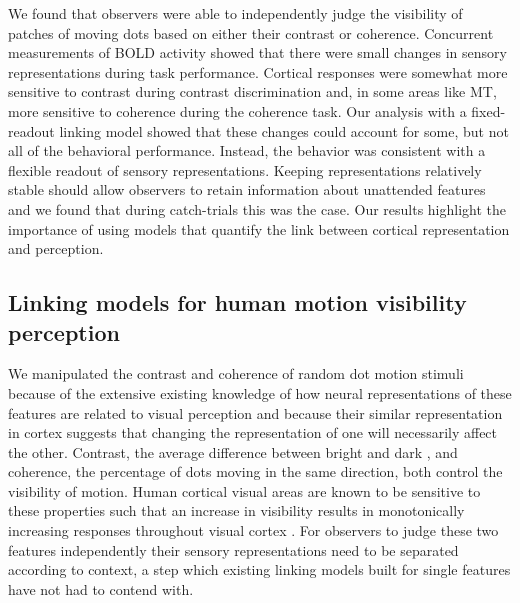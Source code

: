 We found that observers were able to independently judge the visibility of patches of moving dots based on either their contrast or coherence. Concurrent measurements of BOLD activity showed that there were small changes in sensory representations during task performance. Cortical responses were somewhat more sensitive to contrast during contrast discrimination and, in some areas like MT, more sensitive to coherence during the coherence task. Our analysis with a fixed-readout linking model showed that these changes could account for some, but not all of the behavioral performance. Instead, the behavior was consistent with a flexible readout of sensory representations. Keeping representations relatively stable should allow observers to retain information about unattended features and we found that during catch-trials this was the case. Our results highlight the importance of using models that quantify the link between cortical representation and perception.

\subsection{Linking models for human motion visibility perception}

We manipulated the contrast and coherence of random dot motion stimuli because of the extensive existing knowledge of how neural representations of these features are related to  visual perception \citep{Gold2007-ys} and because their similar representation in cortex suggests that changing the representation of one will necessarily affect the other. Contrast, the average difference between bright and dark \citep{Bex2002-it}, and coherence, the percentage of dots moving in the same direction, both control the visibility of motion. Human cortical visual areas are known to be sensitive to these properties such that an increase in visibility results in monotonically increasing responses throughout visual cortex \citep{Avidan2002-jg,Birman2018-sp,Britten1993-oh,Gardner2005-pg,Logothetis2001-kk,Olman2004-dd,Boynton1996-ff,Olman2004-dd,Rees2000-ul,Tootell1998-bb,Simoncelli1998-ts}. For observers to judge these two features independently their sensory representations need to be separated according to context, a step which existing linking models built for single features have not had to contend with.


